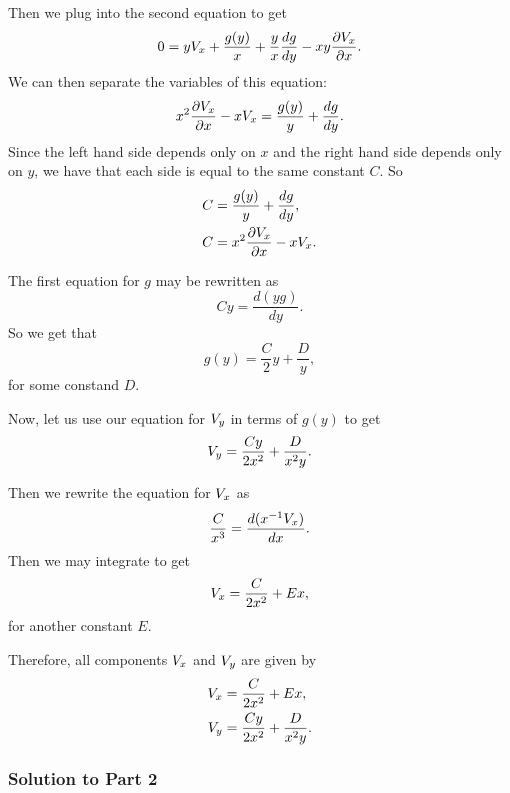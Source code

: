 Then we plug into the second equation to get
\begin{equation}
0 = yV_x + \frac{g(y)}{x} + \frac{y}{x}\frac{dg}{dy} - xy \frac{\partial V_x}{\partial x}.
\end{equation}
We can then separate the variables of this equation: 
\begin{equation}
x^2 \frac{\partial V_x}{\partial x} - xV_x = \frac{g(y)}{y} + \frac{dg}{dy}.
\end{equation}
Since the left hand side depends only on \(x\) and the right hand side depends only on \(y\), we have
that each side is equal to the same constant \(C\). So
\begin{align}
C & = \frac{g(y)}{y} + \frac{dg}{dy}, \\
C & = x^2 \frac{\partial V_x}{\partial x} - xV_x. 
\end{align}

The first equation for \(g\) may be rewritten as 
\begin{equation}
Cy = \frac{d (yg)} {dy}.
\end{equation}
So we get that
\begin{equation}
g(y) = \frac{C}{2}y + \frac{D}{y},
\end{equation}
for some constand \(D\).

Now, let us use our equation for \(V_y\) in terms of \(g(y)\) to get
\begin{equation}
V_y = \frac{Cy}{2x^2}  + \frac{D}{x^2 y}.
\end{equation}

Then we rewrite the equation for \(V_x\) as
\begin{equation}
\frac{C}{x^3} = \frac{d (x^{-1} V_x)}{dx}.
\end{equation}
Then we may integrate to get
\begin{equation}
V_x = \frac{C}{2x^2} + Ex,
\end{equation}
for another constant \(E\). 

Therefore, all components \(V_x\) and \(V_y\) are given by
\begin{align}
V_x & = \frac{C}{2x^2} + Ex, \\
V_y & = \frac{Cy}{2x^2}  + \frac{D}{x^2 y}.
\end{align}

\subsubsection*{Solution to Part 2}

